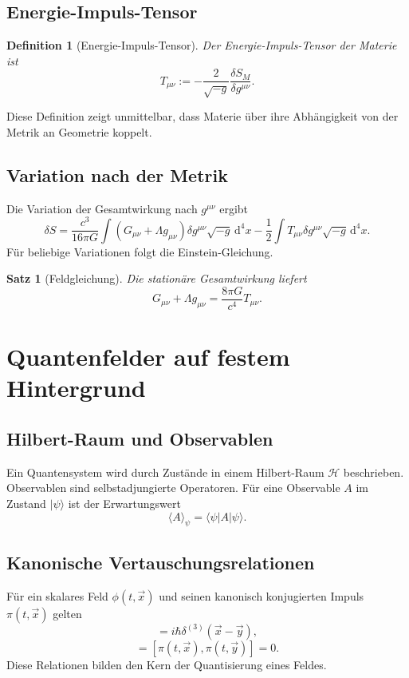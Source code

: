 \documentclass[11pt,a4paper,openany]{book}
\newtheorem{definition}{Definition}[chapter]
\newtheorem{satz}{Satz}[chapter]
\theoremstyle{remark}
\newcommand{\Hh}{\mathcal{H}}
\newcommand{\diff}{\mathrm{d}}
\newcommand{\ket}[1]{|#1\rangle}
\newcommand{\bra}[1]{\langle #1|}
\begin{document}
\section{Energie-Impuls-Tensor}
\begin{definition}[Energie-Impuls-Tensor]
Der Energie-Impuls-Tensor der Materie ist
\begin{equation}
T_{\mu\nu}:=-\frac{2}{\sqrt{-g}}\frac{\delta S_M}{\delta g^{\mu\nu}}.
\end{equation}
\end{definition}
Diese Definition zeigt unmittelbar, dass Materie über ihre Abhängigkeit von der Metrik an Geometrie koppelt.

\section{Variation nach der Metrik}
Die Variation der Gesamtwirkung nach $g^{\mu\nu}$ ergibt
\begin{equation}
\delta S=\frac{c^3}{16\pi G}\int (G_{\mu\nu}+\Lambda g_{\mu\nu})\delta g^{\mu\nu}\sqrt{-g}\,\diff^4x-\frac12\int T_{\mu\nu}\delta g^{\mu\nu}\sqrt{-g}\,\diff^4x.
\end{equation}
Für beliebige Variationen folgt die Einstein-Gleichung.

\begin{satz}[Feldgleichung]
Die stationäre Gesamtwirkung liefert
\begin{equation}
G_{\mu\nu}+\Lambda g_{\mu\nu}=\frac{8\pi G}{c^4}T_{\mu\nu}.
\end{equation}
\end{satz}

\chapter{Quantenfelder auf festem Hintergrund}
\section{Hilbert-Raum und Observablen}
Ein Quantensystem wird durch Zustände in einem Hilbert-Raum $\Hh$ beschrieben. Observablen sind selbstadjungierte Operatoren. Für eine Observable $A$ im Zustand $\ket{\psi}$ ist der Erwartungswert
\begin{equation}
\langle A\rangle_\psi=\bra{\psi}A\ket{\psi}.
\end{equation}

\section{Kanonische Vertauschungsrelationen}
Für ein skalares Feld $\phi(t,\vec{x})$ und seinen kanonisch konjugierten Impuls $\pi(t,\vec{x})$ gelten
\begin{equation}
[\phi(t,\vec{x}),\pi(t,\vec{y})]=i\hbar\delta^{(3)}(\vec{x}-\vec{y}),
\end{equation}
\begin{equation}
[\phi(t,\vec{x}),\phi(t,\vec{y})]=[\pi(t,\vec{x}),\pi(t,\vec{y})]=0.
\end{equation}
Diese Relationen bilden den Kern der Quantisierung eines Feldes.
\end{document}
